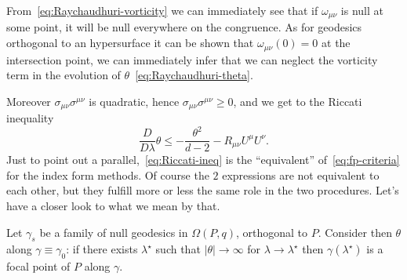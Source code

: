 From~\eqref{eq:Raychaudhuri-vorticity} we can immediately see that if \(\omega_{\mu\nu}\) is null at some point, it will be null everywhere on the congruence. As for geodesics orthogonal to an hypersurface it can be shown that \(\omega_{\mu\nu}(0) = 0\) at the intersection point, we can immediately infer that we can neglect the vorticity term in the evolution of \(\theta\)~\eqref{eq:Raychaudhuri-theta}.
	
\noindent Moreover \(\sigma_{\mu\nu}\sigma^{\mu\nu}\) is quadratic, hence \(\sigma_{\mu\nu}\sigma^{\mu\nu} \ge 0\), and we get to the Riccati inequality
\begin{equation}
	\label{eq:Riccati-ineq}
	\frac{D}{D\lambda}\theta \le -\frac{\theta^2}{d - 2} - R_{\mu\nu}U^{\mu}U^{\nu}.
\end{equation}
Just to point out a parallel,~\eqref{eq:Riccati-ineq} is the ``equivalent'' of~\eqref{eq:fp-criteria} for the index form methods. Of course the \(2\) expressions are not equivalent to each other, but they fulfill more or less the same role in the two procedures. Let's have a closer look to what we mean by that.
	
\begin{prop}
	\label{prop:fp-criteria-Raychaudhuri}
	Let \(\gamma_s\) be a family of null geodesics in \(\Omega(P,q)\), orthogonal to \(P\). Consider then \(\theta\) along \(\gamma \equiv \gamma_0\): if there exists \(\lambda^{\star}\) such that \(\vert\theta\vert \rightarrow \infty\) for \(\lambda \rightarrow \lambda^{\star}\) then \(\gamma(\lambda^{\star})\) is a focal point of \(P\) along \(\gamma\).
\end{prop}

